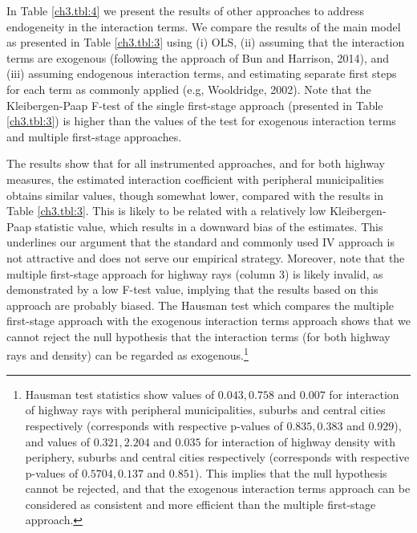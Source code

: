 \documentclass[a4paper,authoryear,review]{elsarticle}  	%
\begin{document}
	In Table \ref{ch3.tbl:4} we present the results of other approaches to address endogeneity in the interaction terms. We compare the results of the main model as presented in Table \ref{ch3.tbl:3} using (i) OLS, (ii) assuming that the interaction terms are exogenous (following the approach of Bun and Harrison, 2014), and (iii) assuming endogenous interaction terms, and estimating separate first steps for each term as commonly applied (e.g, Wooldridge, 2002). Note that the Kleibergen-Paap F-test of the single first-stage approach (presented in Table \ref{ch3.tbl:3}) is higher than the values of the test for exogenous interaction terms and multiple first-stage approaches. 
	
	
	The results show that for all instrumented approaches, and for both highway measures, the estimated interaction coefficient with peripheral municipalities obtains similar values, though somewhat lower, compared with the results in Table \ref{ch3.tbl:3}. This is likely to be related with a relatively low Kleibergen-Paap statistic value, which results in a downward bias of the estimates.
	This underlines our argument that the standard and commonly used IV approach is not attractive and does not serve our empirical strategy.
	Moreover, note that the multiple first-stage approach for highway rays (column 3) is likely invalid, as demonstrated by a low F-test value, implying that the results based on this approach are probably biased. 	
	The Hausman test which compares the multiple first-stage approach with the exogenous interaction terms approach shows that we cannot reject the null hypothesis that the interaction terms (for both highway rays and density) can be regarded as exogenous.\footnote{Hausman test statistics show values of $0.043, 0.758$ and $0.007$ for interaction of highway rays with peripheral municipalities, suburbs and central cities respectively (corresponds with respective p-values of $0.835, 0.383$ and $0.929$), and values of $0.321, 2.204$ and $0.035$ for interaction of highway density with periphery, suburbs and central cities respectively (corresponds with respective p-values of $0.5704, 0.137$ and $0.851$). This implies that the null hypothesis cannot be rejected, and that the exogenous interaction terms approach can be considered as consistent and more efficient than the multiple first-stage approach.}	
	
\end{document}
